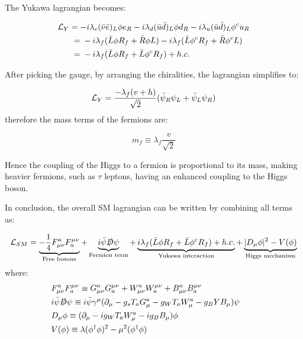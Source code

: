 The Yukawa lagrangian becomes:

\begin{align}
    \MoveEqLeft[3]
    \Lagr_Y = -i\lambda_e (\Bar{\nu}\Bar{e})_L \phi e_R - i\lambda_d (\Bar{u}\Bar{d})_L \phi d_R - i\lambda_u (\Bar{u}\Bar{d})_L \phi^c u_R \\ ={}& -i\lambda_f (\Bar{L}\phi R_f + \Bar{R}\phi L) - i\lambda_f(\Bar{L}\phi^c R_f + \Bar{R}\phi^c L) \\ ={}& -i\lambda_f(\Bar{L}\phi R_f + \Bar{L}\phi^cR_f) + h.c.
\end{align}

After picking the gauge, by arranging the chiralities, the lagrangian simplifies to:

\begin{equation}
    \mathcal{L}_Y = \frac{-\lambda_f (v+h)}{\sqrt{2}}(\Bar{\psi}_R\psi_L + \Bar{\psi}_L\psi_R)
\end{equation}
therefore the mass terms of the fermions are:

\begin{equation}
    m_f \equiv \lambda_f \frac{v}{\sqrt{2}}
\end{equation}

Hence the coupling of the Higgs to a fermion is proportional to its mass, making heavier fermions, such as $\tau$ leptons, having an enhanced coupling to the Higgs boson.

In conclusion, the overall SM lagrangian can be written by combining all terms as:

\begin{equation}
    \mathcal{L}_{SM} = \underbrace{- \frac{1}{4} F_{\mu\nu}^a F^{\mu\nu}_a}_{\text{Free bosons}} + \underbrace{i\Bar{\psi}\slashed{D}\psi}_{\text{Fermion term}} +\underbrace{i\lambda_f(\Bar{L}\phi R_f + \Bar{L}\phi^cR_f) + h.c.}_{\text{Yukawa interaction}} + \underbrace{|D_{\mu}\phi|^2 - V(\phi)}_{\text{Higgs mechanism}}
\end{equation}
where:
\begin{align*}
    & F_{\mu\nu}^a F^{\mu\nu}_a \equiv G_{\mu\nu}^a G^{\mu\nu}_a + W_{\mu\nu}^a W^{\mu\nu}_a + B_{\mu\nu}^a B^{\mu\nu}_a \\
    & i\Bar{\psi}\slashed{D}\psi \equiv i\Bar{\psi}\gamma^{\mu} (\partial_{\mu} - g_s T_a G_{\mu}^a - g_W T_a W^{a}_{\mu} - g_B Y B_{\mu})  \psi \\
    & D_{\mu}\phi \equiv (\partial_{\mu} - ig_W T_a W_{\mu}^{a} - ig_B B_{\mu})\phi \\
    & V(\phi) \equiv \lambda(\phi^{\dagger}\phi)^2 - \mu^2 (\phi^{\dagger}\phi) &&
\end{align*}

